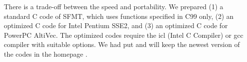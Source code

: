 \documentclass{svmult}
\begin{document}
There is a trade-off between the speed and portability.
We prepared (1) a standard C code of SFMT, which uses 
functions specified in C99 only, (2) an optimized C code for
Intel Pentium SSE2, and 
(3) an optimized C code for PowerPC AltiVec. The optimized codes require
the icl (Intel C Compiler) or gcc compiler with suitable options.
We had put and will keep the newest version of the codes 
in the homepage \cite{SFMT}.



\end{document}
